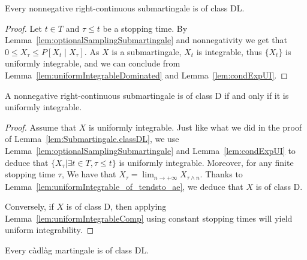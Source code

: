 \begin{lemma}\label{lem:Submartingale.classDL}
  \leanok
Every nonnegative right-continuous submartingale is of class DL.
\end{lemma}

\begin{proof}
  \leanok
Let $t \in T$ and $\tau \le t$ be a stopping time. By Lemma~\ref{lem:optionalSamplingSubmartingale} and nonnegativity we get that $0 \le X_\tau \le P[X_t \mid X_\tau]$. As $X$ is a submartingale, $X_t$ is integrable, thus $\{X_t\}$ is uniformly integrable, and we can conclude from Lemma~\ref{lem:uniformIntegrableDominated} and Lemma~\ref{lem:condExpUI}.
\end{proof}


\begin{lemma}\label{lem:Submartingale.classD_iff_uniformIntegrable}
  \leanok
A nonnegative right-continuous submartingale is of class D if and only if it is uniformly integrable.
\end{lemma}

\begin{proof}
  \leanok
Assume that $X$ is uniformly integrable. Just like what we did in the proof of Lemma~\ref{lem:Submartingale.classDL}, we use Lemma~\ref{lem:optionalSamplingSubmartingale} and Lemma~\ref{lem:condExpUI} to deduce that $\{X_\tau|\exists t\in T, \tau\le t\}$ is uniformly integrable. Moreover, for any finite stopping time $\tau$, We have that $X_\tau = \lim_{n \to +\infty} X_{\tau \land n}$. Thanks to Lemma~\ref{lem:uniformIntegrable_of_tendsto_ae}, we deduce that $X$ is of class D.

Conversely, if $X$ is of class D, then applying Lemma~\ref{lem:uniformIntegrableComp} using constant stopping times will yield uniform integrability.
\end{proof}


\begin{lemma}\label{lem:Martingale.classDL}
  \leanok
Every càdlàg martingale is of class DL.
\end{lemma}

